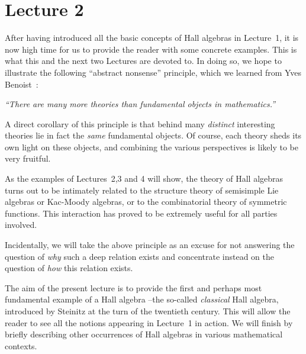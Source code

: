 \documentclass[a4paper,10pt]{amsart}
\numberwithin{equation}{section}
\begin{document}
\newpage

\section{Lecture 2}


\setcounter{section}{2}
\setcounter{equation}{0}
\setcounter{theo}{0}

\vspace{.2in}

After having introduced all the basic concepts of Hall algebras in Lecture~1, it is now high time for us to provide the reader with some concrete examples. This is what this and the next two Lectures are devoted to. In doing so, we hope to illustrate the following ``abstract nonsense'' principle, which we learned from Yves Benoist~:

\vspace{.1in}

\textit{
``There are many more theories than fundamental objects in mathematics.''}

\vspace{.1in}

A direct corollary of this principle is that behind many \textit{distinct} interesting theories lie in fact the \textit{same} fundamental objects. Of course, each theory sheds its own light on these objects, and combining the various perspectives is likely to be very fruitful.

As the examples of Lectures~2,3 and 4 will show, the theory of Hall algebras turns out to be intimately related to the structure theory of semisimple Lie algebras or Kac-Moody algebras, or to the combinatorial theory of symmetric functions. This interaction has proved to be extremely useful for all parties involved.

Incidentally, we will take the above principle as an excuse for not answering the question of \textit{why} such a deep relation exists and concentrate instead on the question of \textit{how} this relation exists.

\vspace{.2in}

The aim of the present lecture is to provide the first and perhaps most fundamental example of a Hall algebra --the so-called \textit{classical} Hall algebra, introduced by Steinitz at the turn of the twentieth century. This will allow the reader to see all the notions appearing in Lecture~1 in action. We will finish by briefly describing other occurrences of Hall algebras in various mathematical contexts.
\end{document}
